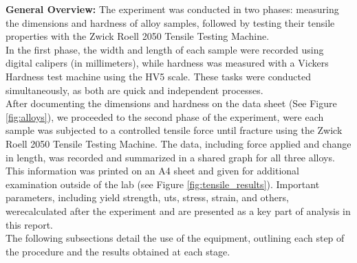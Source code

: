 \documentclass{article}
\begin{document}
\textbf{General Overview:}
The experiment was conducted in two phases: measuring the dimensions and hardness of alloy samples, followed by testing their tensile properties with the Zwick Roell 2050 Tensile Testing Machine. \\[8pt]
In the first phase, the width and length of each sample were recorded using digital calipers (in millimeters), while hardness was measured with a Vickers Hardness test machine using the HV5 scale. These tasks were conducted simultaneously, as both are quick and independent processes.\\[8pt]
After documenting the dimensions and hardness on the data sheet (See Figure \ref{fig:alloys}), we proceeded to the second phase of the experiment, were each sample was subjected to a controlled tensile force until fracture using the Zwick Roell 2050 Tensile Testing Machine. The data, including force applied and change in length, was recorded and summarized in a shared graph for all three alloys. This information was printed on an A4 sheet and given for additional examination outside of the lab (see Figure \ref{fig:tensile_results}). Important parameters, including yield strength, uts, stress, strain, and others, werecalculated after the experiment and are presented as a key part of analysis in this report.\\[8pt]
The following subsections detail the use of the equipment, outlining each step of the procedure and the results obtained at each stage.\\
\newpage
\end{document}

